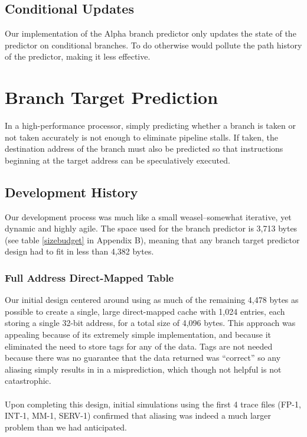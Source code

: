 \documentclass[twocolumn]{article}
\begin{document}
\subsection{Conditional Updates}
Our implementation of the Alpha branch predictor only updates the state of the predictor on conditional branches. To do otherwise would pollute the path history of the predictor, making it less effective. 
\section{Branch Target Prediction}
In a high-performance processor, simply predicting whether a branch is taken or not taken accurately is not enough to eliminate pipeline stalls.  If taken, the destination address of the branch must also be predicted so that instructions beginning at the target address can be speculatively executed. 
\subsection{Development History}
Our development process was much like a small weasel--somewhat iterative, yet dynamic and highly agile.  The space used for the branch predictor is 3,713 bytes (see table \ref{sizebudget} in Appendix B), meaning that any branch target predictor design had to fit in less than 4,382 bytes.
\subsubsection{Full Address Direct-Mapped Table}
Our initial design centered around using as much of the remaining 4,478 bytes as possible to create a single, large direct-mapped cache with 1,024 entries, each storing a single 32-bit address, for a total size of 4,096 bytes.  This approach was appealing because of its extremely simple implementation, and because it eliminated the need to store tags for any of the data.  Tags are not needed because there was no guarantee that the data returned was ``correct'' so any aliasing simply results in in a misprediction, which though not helpful is not catastrophic. \\\\
Upon completing this design, initial simulations using the first 4 trace files (FP-1, INT-1, MM-1, SERV-1) confirmed that aliasing was indeed a much larger problem than we had anticipated.
\end{document}
